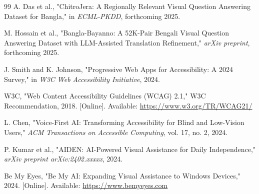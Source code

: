 \documentclass[conference]{IEEEtran}
\begin{document}
\begin{thebibliography}{99}
A. Das et al., "ChitroJera: A Regionally Relevant Visual Question Answering Dataset for Bangla," in \textit{ECML-PKDD}, forthcoming 2025.

M. Hossain et al., "Bangla-Bayanno: A 52K-Pair Bengali Visual Question Answering Dataset with LLM-Assisted Translation Refinement," \textit{arXiv preprint}, forthcoming 2025.

J. Smith and K. Johnson, "Progressive Web Apps for Accessibility: A 2024 Survey," in \textit{W3C Web Accessibility Initiative}, 2024.

W3C, "Web Content Accessibility Guidelines (WCAG) 2.1," W3C Recommendation, 2018. [Online]. Available: \url{https://www.w3.org/TR/WCAG21/}

L. Chen, "Voice-First AI: Transforming Accessibility for Blind and Low-Vision Users," \textit{ACM Transactions on Accessible Computing}, vol. 17, no. 2, 2024.

P. Kumar et al., "AIDEN: AI-Powered Visual Assistance for Daily Independence," \textit{arXiv preprint arXiv:2402.xxxxx}, 2024.

Be My Eyes, "Be My AI: Expanding Visual Assistance to Windows Devices," 2024. [Online]. Available: \url{https://www.bemyeyes.com}

\end{thebibliography}
\end{document}
